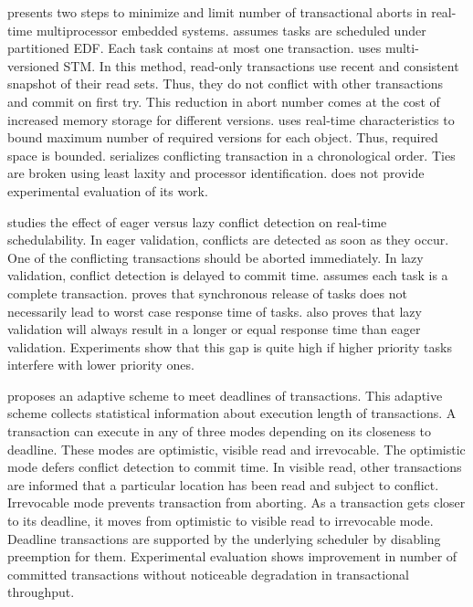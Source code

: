 \documentclass[12pt,english]{report}
\begin{document}
\cite{6068352} presents two steps to minimize and limit number of
transactional aborts in real-time multiprocessor embedded systems.
\cite{6068352} assumes tasks are scheduled under partitioned EDF.
Each task contains at most one transaction. \cite{6068352} uses multi-versioned
STM. In this method, read-only transactions use recent and consistent
snapshot of their read sets. Thus, they do not conflict with other
transactions and commit on first try. This reduction in abort number
comes at the cost of increased memory storage for different versions.
\cite{6068352} uses real-time characteristics to bound maximum number
of required versions for each object. Thus, required space is bounded.
\cite{6068352} serializes conflicting transaction in a chronological
order. Ties are broken using least laxity and processor identification.
\cite{6068352} does not provide experimental evaluation of its work. 

\cite{5665752} studies the effect of eager versus lazy conflict detection
on real-time schedulability. In eager validation, conflicts are detected
as soon as they occur. One of the conflicting transactions should
be aborted immediately. In lazy validation, conflict detection is
delayed to commit time. \cite{5665752} assumes each task is a complete
transaction. \cite{5665752} proves that synchronous release of tasks
does not necessarily lead to worst case response time of tasks. \cite{5665752}
also proves that lazy validation will always result in a longer or
equal response time than eager validation. Experiments show that this
gap is quite high if higher priority tasks interfere with lower priority
ones.

\cite{5958224}proposes an adaptive scheme to meet deadlines of transactions.
This adaptive scheme collects statistical information about execution
length of transactions. A transaction can execute in any of three
modes depending on its closeness to deadline. These modes are optimistic,
visible read and irrevocable. The optimistic mode defers conflict
detection to commit time. In visible read, other transactions are
informed that a particular location has been read and subject to conflict.
Irrevocable mode prevents transaction from aborting. As a transaction
gets closer to its deadline, it moves from optimistic to visible read
to irrevocable mode. Deadline transactions are supported by the underlying
scheduler by disabling preemption for them. Experimental evaluation
shows improvement in number of committed transactions without noticeable
degradation in transactional throughput.
\end{document}
